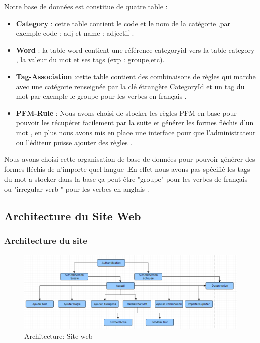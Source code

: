\documentclass[12pt,a4paper]{article}
\begin{document}
\newpage
Notre base de données est constitue de quatre table : 
\begin{itemize}
\item \textbf{Category} : cette table contient le code et le nom de la catégorie ,par exemple code : adj et name : adjectif .
\item \textbf{Word} : la table word contient une référence categoryid vers la table category , la valeur du mot et ses tags (exp : groupe,etc).
\item \textbf{Tag-Association} :cette table contient des combinaisons de règles qui marche avec une catégorie renseignée par la clé étrangère CategoryId  et un tag du mot par exemple le groupe pour les verbes en français .
\item \textbf{PFM-Rule} : Nous avons choisi de stocker les règles PFM en base pour pouvoir les récupérer facilement par la suite et générer les formes fléchis d'un mot , en plus nous avons mis en place une interface pour que l'administrateur ou l'éditeur puisse ajouter des règles .

\end{itemize}



Nous avons choisi cette organisation de base de données pour pouvoir générer des formes fléchis de n'importe quel langue .En effet nous avons pas spécifié les tags du mot a stocker dans la base ça peut être "groupe" pour les verbes de français ou "irregular verb " pour les verbes en anglais .



\subsection{ Architecture du Site Web }
\subsubsection{Architecture du site} 
\newpage
\begin{figure}[h]
\centering
\includegraphics[width=150mm]{img/site.PNG}
\caption{Architecture: Site web}
\label{Tux}
\end{figure}
\end{document}
